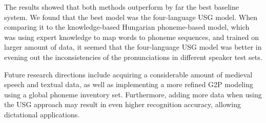 \documentclass[runningheads,a4paper]{llncs}
\begin{document}
The results showed that both methods outperform by far the best baseline system. 
We found that the best model was the four-language USG model.
When comparing it to the knowledge-based Hungarian phoneme-based model, which was using expert knowledge to map words to phoneme sequences, and trained on larger amount of data, it seemed that the four-language USG model was better in evening out the inconsistencies of the pronunciations in different speaker test sets.

Future research directions include acquiring a considerable amount of medieval speech and textual data, as well as implementing a more refined G2P modeling using a global phoneme inventory set.
Furthermore, adding more data when using the USG approach may result in even higher recognition accuracy, allowing dictational applications.



\end{document}
